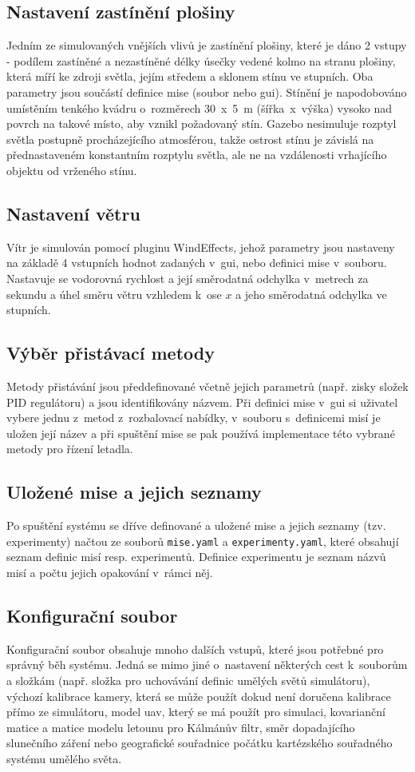     \subsection{Nastavení zastínění plošiny}
      Jedním ze simulovaných vnějších vlivů je zastínění plošiny, které je dáno 2 vstupy - podílem zastíněné a nezastíněné délky úsečky vedené kolmo na stranu plošiny, která míří ke zdroji světla, jejím středem a sklonem stínu ve stupních. Oba parametry jsou součástí definice mise (soubor nebo \acrshort{gui}). Stínění je napodobováno umístěním tenkého kvádru o~rozměrech 30~x~5~m (šířka~x~výška) vysoko nad povrch na takové místo, aby vznikl požadovaný stín. Gazebo nesimuluje rozptyl světla postupně procházejícího atmosférou, takže ostrost stínu je závislá na přednastaveném konstantním rozptylu světla, ale ne na vzdálenosti vrhajícího objektu od vrženého stínu.
    \subsection{Nastavení větru}
      Vítr je simulován pomocí pluginu WindEffects, jehož parametry jsou nastaveny na základě 4 vstupních hodnot zadaných v~\acrshort{gui}, nebo definici mise v~souboru. Nastavuje se vodorovná rychlost a její směrodatná odchylka v~metrech za sekundu a úhel směru větru vzhledem k~ose $x$ a jeho směrodatná odchylka ve stupních.
    \subsection{Výběr přistávací metody}
      Metody přistávání jsou předdefinované včetně jejich parametrů (např. zisky složek PID regulátoru) a jsou identifikovány názvem. Při definici mise v~\acrshort{gui} si uživatel vybere jednu z~metod z~rozbalovací nabídky, v~souboru s~definicemi misí je uložen její název a při spuštění mise se pak používá implementace této vybrané metody pro řízení letadla.
    \subsection{Uložené mise a jejich seznamy} \label{sec:saved}
      Po spuštění systému se dříve definované a uložené mise a jejich seznamy (tzv. experimenty) načtou ze souborů \texttt{mise.yaml} a \texttt{experimenty.yaml}, které obsahují seznam definic misí resp. experimentů. Definice experimentu je seznam názvů misí a počtu jejich opakování v~rámci něj.
    \subsection{Konfigurační soubor}
      Konfigurační soubor obsahuje mnoho dalších vstupů, které jsou potřebné pro správný běh systému. Jedná se mimo jiné o~nastavení některých cest k~souborům a složkám (např. složka pro uchovávání definic umělých světů simulátoru), výchozí kalibrace kamery, která se může použít dokud není doručena kalibrace přímo ze simulátoru, model \acrshort{uav}, který se má použít pro simulaci, kovarianční matice a matice modelu letounu pro Kálmánův filtr, směr dopadajícího slunečního záření nebo geografické souřadnice počátku kartézského souřadného systému umělého světa.
